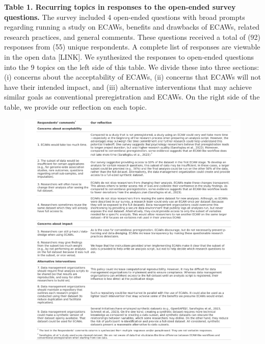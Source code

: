 \documentclass[
  man,floatsintext]{apa6}
\begin{document}
\protect{}
\protect{}

\textbf{Table 1. Recurring topics in responses to the open-ended survey questions.} The survey included 4 open-ended questions with broad prompts regarding running a study on ECAWs, benefits and drawbacks of ECAWs, related research practices, and general comments. These questions received a total of (92) responses from (55) unique respondents. A complete list of responses are viewable in the open data {[}LINK{]}. We synthesized the responses to open-ended questions into the 9 topics on the left side of this table. We divide these into three sections: (i) concerns about the acceptability of ECAWs, (ii) concerns that ECAWs will not have their intended impact, and (iii) alternative interventions that may achieve similar goals as conventional preregistration and ECAWs. On the right side of the table, we provide our reflection on each topic.

\begin{figure}

{\centering \includegraphics[width=1\linewidth]{figs/open-ended-table_figure} 

}

\caption{ }\label{fig:openEndedTable}
\end{figure}
\end{document}

